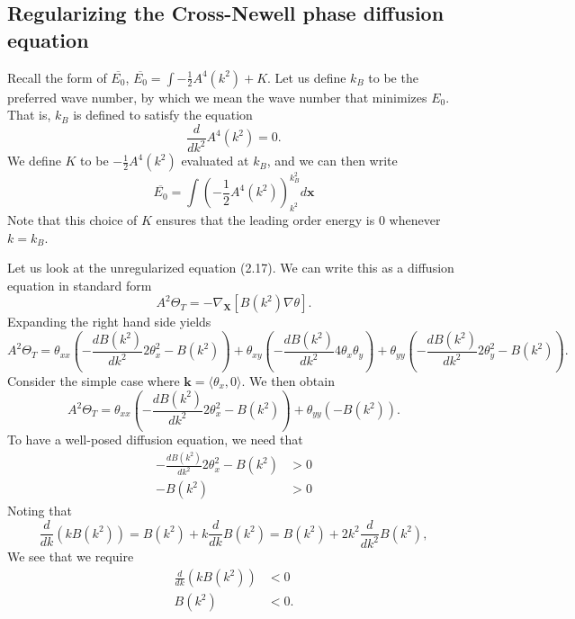 \documentclass[12pt]{article}
\numberwithin{equation}{section}
\begin{document}
\subsection{Regularizing the Cross-Newell phase diffusion equation}
Recall the form of $\overline{E_0}$, $\overline{E_0} = \int -\frac{1}{2}A^4(k^2)+K$.
Let us define $k_B$ to be the preferred wave number, by which we mean the wave number that minimizes $E_0$.
That is, $k_B$ is defined to satisfy the equation
\begin{equation}
    \frac{d}{dk^2}A^4(k^2) = 0.
\end{equation}
We define $K$ to be $-\frac{1}{2}A^4(k^2)$ evaluated at $k_B$, and we can then write
\begin{equation}
    \overline{E_0} = \int \left( -\frac{1}{2}A^4(k^2)\right)_{k^2}^{k_B^2}d\bm{x}
\end{equation}
Note that this choice of $K$ ensures that the leading order energy is $0$ whenever $k = k_B$.
\par Let us look at the unregularized equation (2.17). We can write this as a diffusion equation in standard form
\begin{equation}
    A^2\Theta_T = -\nabla_{\bm{X}}\left[ B(k^2)\nabla \theta\right].
\end{equation}
Expanding the right hand side yields
\begin{equation}
    A^2\Theta_T = \theta_{xx}\left(-\frac{dB(k^2)}{dk^2}2\theta_x^2 - B(k^2)\right) + \theta_{xy}\left(-\frac{dB(k^2)}{dk^2}4\theta_x\theta_y\right) + \theta_{yy}\left(-\frac{dB(k^2)}{dk^2}2\theta_y^2 -B(k^2)\right).
\end{equation}
Consider the simple case where $\bm{k} = \langle \theta_x, 0\rangle$.
We then obtain
\begin{equation*}
    A^2\Theta_T = \theta_{xx}\left(-\frac{dB(k^2)}{dk^2}2\theta_x^2 - B(k^2)\right) + \theta_{yy}\left(-B(k^2)\right). 
\end{equation*}
To have a well-posed diffusion equation, we need that 
\begin{align}
    -\frac{dB(k^2)}{dk^2}2\theta_x^2 - B(k^2) &>0\\
    -B(k^2) &>0
\end{align}
Noting that 
\begin{equation}
    \frac{d}{dk}\left(kB(k^2)\right) = B(k^2)+k\frac{d}{dk}B(k^2) = B(k^2)+2k^2\frac{d}{dk^2}B(k^2),
\end{equation}
We see that we require
\begin{align}
    \frac{d}{dk}(kB(k^2)) &<0\\
    B(k^2) &< 0.
\end{align}
\end{document}
